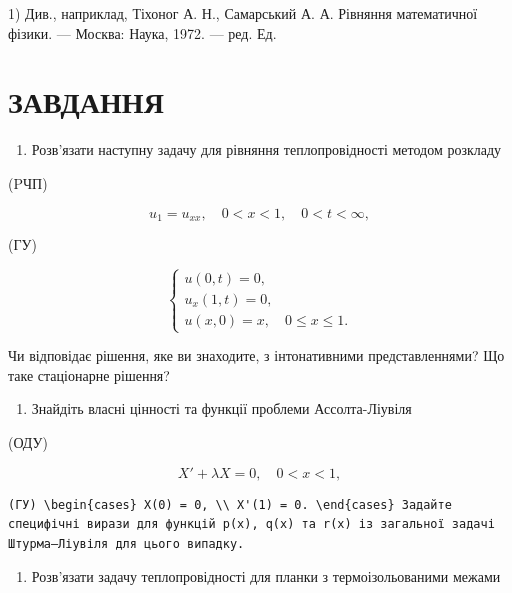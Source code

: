 \documentclass[
  ukrainian,
]{article}
\providecommand{\tightlist}{%
  \setlength{\itemsep}{0pt}\setlength{\parskip}{0pt}}
\begin{document}
1) Див., наприклад, Тіхоног А. Н., Самарський А. А. Рівняння
математичної фізики. --- Москва: Наука, 1972. --- ред. Ед.

\section{ЗАВДАННЯ}\label{ux437ux430ux432ux434ux430ux43dux43dux44f-6}

\begin{enumerate}
\def\labelenumi{\arabic{enumi}.}
\tightlist
\item
  Розв'язати наступну задачу для рівняння теплопровідності методом
  розкладу
\end{enumerate}

(PЧП)

\[
u_1 = u_{xx}, \quad 0 < x < 1, \quad 0 < t < \infty,
\]

(ГУ)

\[
\begin{cases} u(0, t) = 0, \\ u_x(1, t) = 0, \\ u(x, 0) = x, \quad 0 \le x \le 1. \end{cases}
\]

Чи відповідає рішення, яке ви знаходите, з інтонативними
представленнями? Що таке стаціонарне рішення?

\begin{enumerate}
\def\labelenumi{\arabic{enumi}.}
\setcounter{enumi}{1}
\tightlist
\item
  Знайдіть власні цінності та функції проблеми Ассолта-Ліувіля
\end{enumerate}

(ОДУ)

\[
X' + \lambda X = 0, \quad 0 < x < 1,
\]

\begin{verbatim}
(ГУ) \begin{cases} X(0) = 0, \\ X'(1) = 0. \end{cases} Задайте специфічні вирази для функцій p(x), q(x) та r(x) із загальної задачі Штурма–Ліувіля для цього випадку.
\end{verbatim}

\begin{enumerate}
\def\labelenumi{\arabic{enumi}.}
\setcounter{enumi}{2}
\tightlist
\item
  Розв'язати задачу теплопровідності для планки з термоізольованими
  межами
\end{enumerate}
\end{document}
